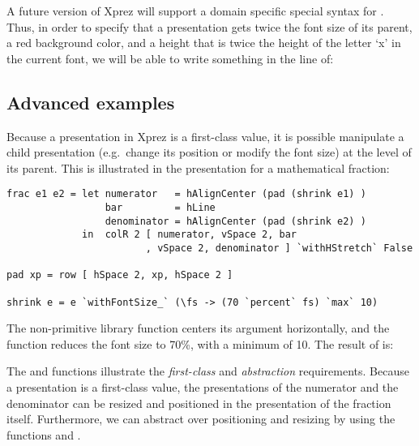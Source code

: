 A future version of {\sc Xprez} will support a domain specific special syntax for . Thus, in order to specify that  a presentation  gets twice the font size of its parent, a red background color, and a height that is twice the height of the letter `x' in the current font, we will be able to write something in the line of: 

\begin{small}
\end{small}

%																
\subsection{Advanced examples}

Because a presentation in {\sc Xprez} is a first-class value, it is possible manipulate a child presentation (e.g.\ change its position or modify the font size) at the level of its parent.  This is illustrated in the presentation for a mathematical fraction: 

\begin{small}
\begin{verbatim}
frac e1 e2 = let numerator   = hAlignCenter (pad (shrink e1) )
                 bar         = hLine
                 denominator = hAlignCenter (pad (shrink e2) )
             in  colR 2 [ numerator, vSpace 2, bar
                        , vSpace 2, denominator ] `withHStretch` False

pad xp = row [ hSpace 2, xp, hSpace 2 ]

shrink e = e `withFontSize_` (\fs -> (70 `percent` fs) `max` 10)
\end{verbatim}
\end{small}

The non-primitive library function  centers its argument horizontally, and the  function reduces the font size to 70\%, with a minimum of 10. The result of  is:

\begin{center}
\end{center}

The  and  functions illustrate the {\em first-class} and {\em abstraction} requirements. Because a presentation is a first-class value, the presentations of the numerator and the denominator can be resized and positioned in the presentation of the fraction itself. Furthermore, we can abstract over positioning and resizing by using the functions  and . 

